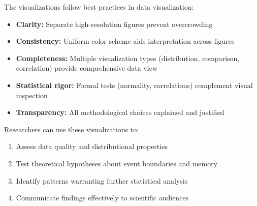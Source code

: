 \documentclass[12pt,a4paper]{article}
\begin{document}
The visualizations follow best practices in data visualization:
\begin{itemize}
    \item \textbf{Clarity:} Separate high-resolution figures prevent overcrowding
    \item \textbf{Consistency:} Uniform color scheme aids interpretation across figures
    \item \textbf{Completeness:} Multiple visualization types (distribution, comparison, correlation) provide comprehensive data view
    \item \textbf{Statistical rigor:} Formal tests (normality, correlations) complement visual inspection
    \item \textbf{Transparency:} All methodological choices explained and justified
\end{itemize}

Researchers can use these visualizations to:
\begin{enumerate}
    \item Assess data quality and distributional properties
    \item Test theoretical hypotheses about event boundaries and memory
    \item Identify patterns warranting further statistical analysis
    \item Communicate findings effectively to scientific audiences
\end{enumerate}
\end{document}
